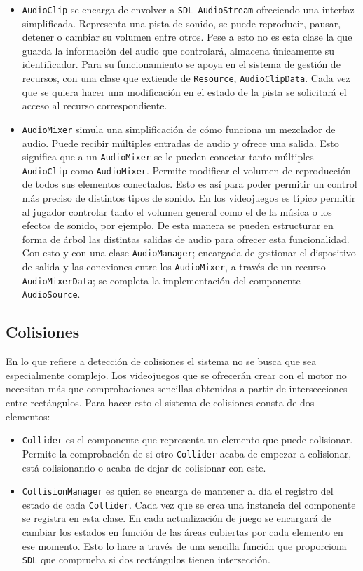 \begin{itemize}
	\item \texttt{AudioClip} se encarga de envolver a \texttt{SDL\_AudioStream} ofreciendo una interfaz simplificada. Representa una pista de sonido, se puede reproducir, pausar, detener o cambiar su volumen entre otros. Pese a esto no es esta clase la que guarda la información del audio que controlará, almacena únicamente su identificador. Para su funcionamiento se apoya en el sistema de gestión de recursos, con una clase que extiende de \texttt{Resource}, \texttt{AudioClipData}. Cada vez que se quiera hacer una modificación en el estado de la pista se solicitará el acceso al recurso correspondiente. 
	\item \texttt{AudioMixer} simula una simplificación de cómo funciona un mezclador de audio. Puede recibir múltiples entradas de audio y ofrece una salida. Esto significa que a un \texttt{AudioMixer} se le pueden conectar tanto múltiples \texttt{AudioClip} como \texttt{AudioMixer}. Permite modificar el volumen de reproducción de todos sus elementos conectados. Esto es así para poder permitir un control más preciso de distintos tipos de sonido. En los videojuegos es típico permitir al jugador controlar tanto el volumen general como el de la música o los efectos de sonido, por ejemplo. De esta manera se pueden estructurar en forma de árbol las distintas salidas de audio para ofrecer esta funcionalidad. Con esto y con una clase \texttt{AudioManager}; encargada de gestionar el dispositivo de salida y las conexiones entre los \texttt{AudioMixer}, a través de un recurso \texttt{AudioMixerData}; se completa la implementación del componente \texttt{AudioSource}.
\end{itemize}

\subsection{Colisiones}
En lo que refiere a detección de colisiones el sistema no se busca que sea especialmente complejo. Los videojuegos que se ofrecerán crear con el motor no necesitan más que comprobaciones sencillas obtenidas a partir de intersecciones entre rectángulos. Para hacer esto el sistema de colisiones consta de dos elementos: 

\begin{itemize}
	\item \texttt{Collider} es el componente que representa un elemento que puede colisionar. Permite la comprobación de si otro \texttt{Collider} acaba de empezar a colisionar, está colisionando o acaba de dejar de colisionar con este. 
	\item \texttt{CollisionManager} es quien se encarga de mantener al día el registro del estado de cada \texttt{Collider}. Cada vez que se crea una instancia del componente se registra en esta clase. En cada actualización de juego se encargará de cambiar los estados en función de las áreas cubiertas por cada elemento en ese momento. Esto lo hace a través de una sencilla función que proporciona \texttt{SDL} que comprueba si dos rectángulos tienen intersección.
\end{itemize}

